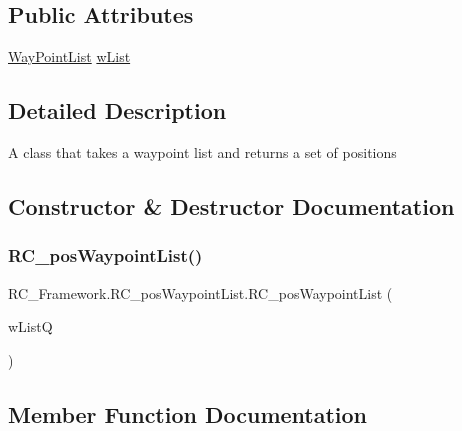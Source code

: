 \subsection*{Public Attributes}
\begin{DoxyCompactItemize}
\item 
\mbox{\hyperlink{class_r_c___framework_1_1_way_point_list}{Way\+Point\+List}} \mbox{\hyperlink{class_r_c___framework_1_1_r_c__pos_waypoint_list_a395db5f819084204a145fe2816b4937e}{w\+List}}
\end{DoxyCompactItemize}


\subsection{Detailed Description}
A class that takes a waypoint list and returns a set of positions 



\subsection{Constructor \& Destructor Documentation}
\mbox{\label{class_r_c___framework_1_1_r_c__pos_waypoint_list_a25dad4f7211d21406f6d347c7ef8fda5}} 
\subsubsection{\texorpdfstring{R\+C\+\_\+pos\+Waypoint\+List()}{RC\_posWaypointList()}}
{\footnotesize\ttfamily R\+C\+\_\+\+Framework.\+R\+C\+\_\+pos\+Waypoint\+List.\+R\+C\+\_\+pos\+Waypoint\+List (\begin{DoxyParamCaption}\item[{\mbox{\hyperlink{class_r_c___framework_1_1_way_point_list}{Way\+Point\+List}}}]{w\+ListQ }\end{DoxyParamCaption})}



\subsection{Member Function Documentation}
\mbox{\label{class_r_c___framework_1_1_r_c__pos_waypoint_list_ae0bea3900f15e35e022f9b1d5c409067}} 
